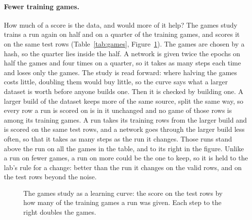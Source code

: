 \ifgames
\paragraph{Fewer training games.}
How much of a score is the data, and would more of it help? The games study
trains a run again on half and on a quarter of the training games, and
scores it on the same test rows (Table~\ref{tab:games},
Figure~\ref{fig:games}). The games are chosen by a hash, so the quarter lies
inside the half. A network is given twice the epochs on half the games and
four times on a quarter, so it takes as many steps each time and loses only
the games. The study is read forward: where halving the games costs little,
doubling them would buy little, so the curve says what a larger dataset is
worth before anyone builds one.
\ifmore
Then it is checked by building one. A larger build of the dataset keeps more
of the same source, split the same way, so every row a run is scored on is
in it unchanged and no game of those rows is among its training games. A run
takes its training rows from the larger build and is scored on the same test
rows, and a network goes through the larger build less often, so that it
takes as many steps as the run it changes. Those runs stand above the run on
all the games in the table, and to its right in the figure. Unlike a run on
fewer games, a run on more could be the one to keep, so it is held to the
lab's rule for a change: better than the run it changes on the valid rows,
and on the test rows beyond the noise.
\fi

\begin{table}[htbp]\centering\footnotesize
{}
\caption{The games study. Each run is trained on a share of the training
games\ifmore, or on a multiple of them from a larger build of the
dataset,\fi{} and scored on all the test rows. Its gain is paired with the
run that was trained on all the games: below zero the run is worse, and bold
when the 95\% interval leaves zero out.}
\label{tab:games}
\end{table}

\begin{figure}[htbp]\centering
{}
\caption{The games study as a learning curve: the score on the test rows by
how many of the training games a run was given. Each step to the right
doubles the games.}
\label{fig:games}
\end{figure}
\fi

